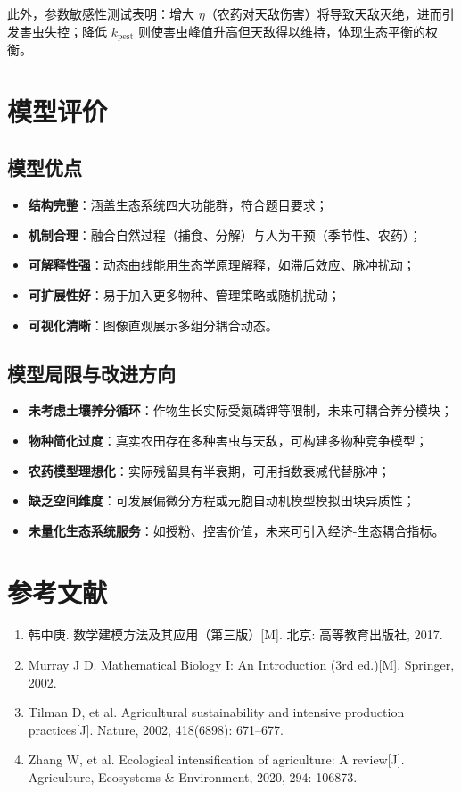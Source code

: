 \documentclass[12pt]{article}
\begin{document}
此外，参数敏感性测试表明：增大 $\eta$（农药对天敌伤害）将导致天敌灭绝，进而引发害虫失控；降低 $k_{\text{pest}}$ 则使害虫峰值升高但天敌得以维持，体现生态平衡的权衡。

\section{模型评价}

\subsection{模型优点}
\begin{itemize}
    \item \textbf{结构完整}：涵盖生态系统四大功能群，符合题目要求；
    \item \textbf{机制合理}：融合自然过程（捕食、分解）与人为干预（季节性、农药）；
    \item \textbf{可解释性强}：动态曲线能用生态学原理解释，如滞后效应、脉冲扰动；
    \item \textbf{可扩展性好}：易于加入更多物种、管理策略或随机扰动；
    \item \textbf{可视化清晰}：图像直观展示多组分耦合动态。
\end{itemize}

\subsection{模型局限与改进方向}
\begin{itemize}
    \item \textbf{未考虑土壤养分循环}：作物生长实际受氮磷钾等限制，未来可耦合养分模块；
    \item \textbf{物种简化过度}：真实农田存在多种害虫与天敌，可构建多物种竞争模型；
    \item \textbf{农药模型理想化}：实际残留具有半衰期，可用指数衰减代替脉冲；
    \item \textbf{缺乏空间维度}：可发展偏微分方程或元胞自动机模型模拟田块异质性；
    \item \textbf{未量化生态系统服务}：如授粉、控害价值，未来可引入经济-生态耦合指标。
\end{itemize}

\section*{参考文献}
\begin{enumerate}
    \item 韩中庚. 数学建模方法及其应用（第三版）[M]. 北京: 高等教育出版社, 2017.
    \item Murray J D. Mathematical Biology I: An Introduction (3rd ed.)[M]. Springer, 2002.
    \item Tilman D, et al. Agricultural sustainability and intensive production practices[J]. Nature, 2002, 418(6898): 671–677.
    \item Zhang W, et al. Ecological intensification of agriculture: A review[J]. Agriculture, Ecosystems \& Environment, 2020, 294: 106873.
\end{enumerate}
\end{document}

